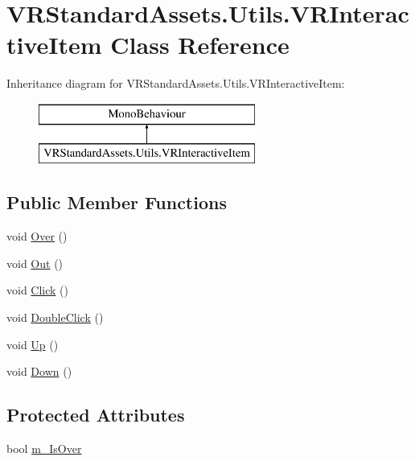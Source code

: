 \hypertarget{class_v_r_standard_assets_1_1_utils_1_1_v_r_interactive_item}{}\section{V\+R\+Standard\+Assets.\+Utils.\+V\+R\+Interactive\+Item Class Reference}
\label{class_v_r_standard_assets_1_1_utils_1_1_v_r_interactive_item}
Inheritance diagram for V\+R\+Standard\+Assets.\+Utils.\+V\+R\+Interactive\+Item\+:\begin{figure}[H]
\begin{center}
\leavevmode
\includegraphics[height=2.000000cm]{class_v_r_standard_assets_1_1_utils_1_1_v_r_interactive_item}
\end{center}
\end{figure}
\subsection*{Public Member Functions}
\begin{DoxyCompactItemize}
\item 
void \mbox{\hyperlink{class_v_r_standard_assets_1_1_utils_1_1_v_r_interactive_item_a976794a3b7a35dad02dab0425d48a3ea}{Over}} ()
\item 
void \mbox{\hyperlink{class_v_r_standard_assets_1_1_utils_1_1_v_r_interactive_item_a7d7a426c71c0033399e4d3cf2957725d}{Out}} ()
\item 
void \mbox{\hyperlink{class_v_r_standard_assets_1_1_utils_1_1_v_r_interactive_item_a99c465d86dac6aee9da60e8fe158d481}{Click}} ()
\item 
void \mbox{\hyperlink{class_v_r_standard_assets_1_1_utils_1_1_v_r_interactive_item_a91b00f355ab0dcc33b57c454ba224381}{Double\+Click}} ()
\item 
void \mbox{\hyperlink{class_v_r_standard_assets_1_1_utils_1_1_v_r_interactive_item_aab8f0ab1f29eb9b8d5afdbde472cc7d3}{Up}} ()
\item 
void \mbox{\hyperlink{class_v_r_standard_assets_1_1_utils_1_1_v_r_interactive_item_afb9128eef421b2c35d4cc4b713d1e41a}{Down}} ()
\end{DoxyCompactItemize}
\subsection*{Protected Attributes}
\begin{DoxyCompactItemize}
\item 
bool \mbox{\hyperlink{class_v_r_standard_assets_1_1_utils_1_1_v_r_interactive_item_aac3eb76e3200547d20c7acb82a9882f8}{m\+\_\+\+Is\+Over}}
\end{DoxyCompactItemize}
